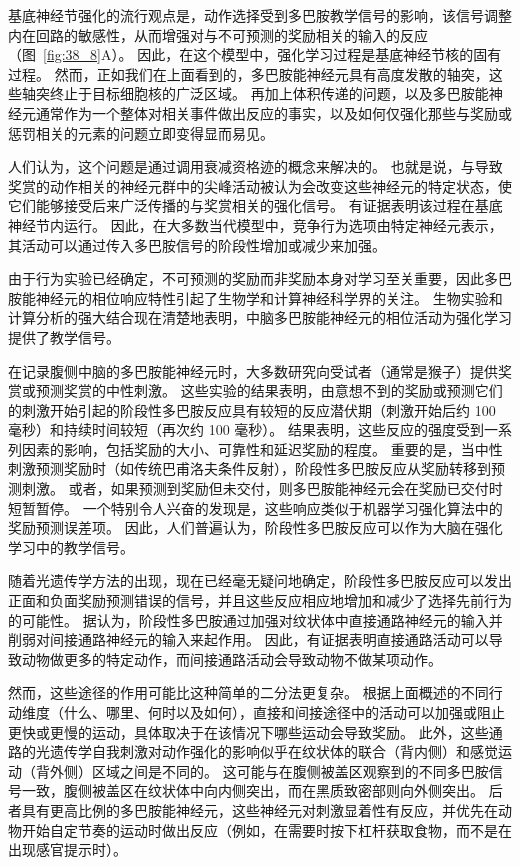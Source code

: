 基底神经节强化的流行观点是，动作选择受到多巴胺教学信号的影响，该信号调整内在回路的敏感性，从而增强对与不可预测的奖励相关的输入的反应（图~\ref{fig:38_8}A）。
因此，在这个模型中，强化学习过程是基底神经节核的固有过程。
然而，正如我们在上面看到的，多巴胺能神经元具有高度发散的轴突，这些轴突终止于目标细胞核的广泛区域。
再加上体积传递的问题，以及多巴胺能神经元通常作为一个整体对相关事件做出反应的事实，以及如何仅强化那些与奖励或惩罚相关的元素的问题立即变得显而易见。


人们认为，这个问题是通过调用衰减资格迹的概念来解决的。
也就是说，与导致奖赏的动作相关的神经元群中的尖峰活动被认为会改变这些神经元的特定状态，使它们能够接受后来广泛传播的与奖赏相关的强化信号。
有证据表明该过程在基底神经节内运行。
因此，在大多数当代模型中，竞争行为选项由特定神经元表示，其活动可以通过传入多巴胺信号的阶段性增加或减少来加强。


由于行为实验已经确定，不可预测的奖励而非奖励本身对学习至关重要，因此多巴胺能神经元的相位响应特性引起了生物学和计算神经科学界的关注。
生物实验和计算分析的强大结合现在清楚地表明，中脑多巴胺能神经元的相位活动为强化学习提供了教学信号。


在记录腹侧中脑的多巴胺能神经元时，大多数研究向受试者（通常是猴子）提供奖赏或预测奖赏的中性刺激。
这些实验的结果表明，由意想不到的奖励或预测它们的刺激开始引起的阶段性多巴胺反应具有较短的反应潜伏期（刺激开始后约 100 毫秒）和持续时间较短（再次约 100 毫秒）。
结果表明，这些反应的强度受到一系列因素的影响，包括奖励的大小、可靠性和延迟奖励的程度。
重要的是，当中性刺激预测奖励时（如传统巴甫洛夫条件反射），阶段性多巴胺反应从奖励转移到预测刺激。 或者，如果预测到奖励但未交付，则多巴胺能神经元会在奖励已交付时短暂暂停。
一个特别令人兴奋的发现是，这些响应类似于机器学习强化算法中的奖励预测误差项。
因此，人们普遍认为，阶段性多巴胺反应可以作为大脑在强化学习中的教学信号。


随着光遗传学方法的出现，现在已经毫无疑问地确定，阶段性多巴胺反应可以发出正面和负面奖励预测错误的信号，并且这些反应相应地增加和减少了选择先前行为的可能性。
据认为，阶段性多巴胺通过加强对纹状体中直接通路神经元的输入并削弱对间接通路神经元的输入来起作用。
因此，有证据表明直接通路活动可以导致动物做更多的特定动作，而间接通路活动会导致动物不做某项动作。


然而，这些途径的作用可能比这种简单的二分法更复杂。
根据上面概述的不同行动维度（什么、哪里、何时以及如何），直接和间接途径中的活动可以加强或阻止更快或更慢的运动，具体取决于在该情况下哪些运动会导致奖励。
此外，这些通路的光遗传学自我刺激对动作强化的影响似乎在纹状体的联合（背内侧）和感觉运动（背外侧）区域之间是不同的。
这可能与在腹侧被盖区观察到的不同多巴胺信号一致，腹侧被盖区在纹状体中向内侧突出，而在黑质致密部则向外侧突出。
后者具有更高比例的多巴胺能神经元，这些神经元对刺激显着性有反应，并优先在动物开始自定节奏的运动时做出反应（例如，在需要时按下杠杆获取食物，而不是在出现感官提示时）。


